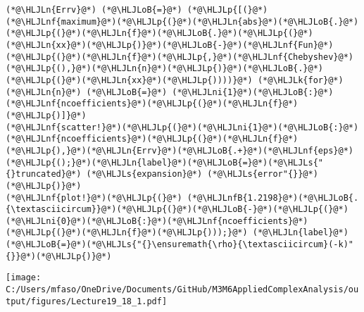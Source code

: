\documentclass[12pt,a4paper]{article}
\newcommand{\HLJLk}[1]{\textcolor[RGB]{148,91,176}{\textbf{#1}}}
\newcommand{\HLJLn}[1]{#1}
\newcommand{\HLJLnf}[1]{\textcolor[RGB]{66,102,213}{#1}}
\newcommand{\HLJLs}[1]{\textcolor[RGB]{201,61,57}{#1}}
\newcommand{\HLJLnfB}[1]{\textcolor[RGB]{59,151,46}{#1}}
\newcommand{\HLJLni}[1]{\textcolor[RGB]{59,151,46}{#1}}
\newcommand{\HLJLoB}[1]{\textcolor[RGB]{102,102,102}{\textbf{#1}}}
\newcommand{\HLJLp}[1]{#1}
\begin{document}
\begin{lstlisting}
(*@\HLJLn{Errv}@*) (*@\HLJLoB{=}@*) (*@\HLJLp{[(}@*)(*@\HLJLnf{maximum}@*)(*@\HLJLp{(}@*)(*@\HLJLn{abs}@*)(*@\HLJLoB{.}@*)(*@\HLJLp{(}@*)(*@\HLJLn{f}@*)(*@\HLJLoB{.}@*)(*@\HLJLp{(}@*)(*@\HLJLn{xx}@*)(*@\HLJLp{)}@*)(*@\HLJLoB{-}@*)(*@\HLJLnf{Fun}@*)(*@\HLJLp{(}@*)(*@\HLJLn{f}@*)(*@\HLJLp{,}@*)(*@\HLJLnf{Chebyshev}@*)(*@\HLJLp{(),}@*)(*@\HLJLn{n}@*)(*@\HLJLp{)}@*)(*@\HLJLoB{.}@*)(*@\HLJLp{(}@*)(*@\HLJLn{xx}@*)(*@\HLJLp{))))}@*) (*@\HLJLk{for}@*) (*@\HLJLn{n}@*) (*@\HLJLoB{=}@*) (*@\HLJLni{1}@*)(*@\HLJLoB{:}@*)(*@\HLJLnf{ncoefficients}@*)(*@\HLJLp{(}@*)(*@\HLJLn{f}@*)(*@\HLJLp{)]}@*)
(*@\HLJLnf{scatter!}@*)(*@\HLJLp{(}@*)(*@\HLJLni{1}@*)(*@\HLJLoB{:}@*)(*@\HLJLnf{ncoefficients}@*)(*@\HLJLp{(}@*)(*@\HLJLn{f}@*)(*@\HLJLp{),}@*)(*@\HLJLn{Errv}@*)(*@\HLJLoB{.+}@*)(*@\HLJLnf{eps}@*)(*@\HLJLp{();}@*)(*@\HLJLn{label}@*)(*@\HLJLoB{=}@*)(*@\HLJLs{"{}truncated}@*) (*@\HLJLs{expansion}@*) (*@\HLJLs{error"{}}@*)(*@\HLJLp{)}@*)
(*@\HLJLnf{plot!}@*)(*@\HLJLp{(}@*) (*@\HLJLnfB{1.2198}@*)(*@\HLJLoB{.{\textasciicircum}}@*)(*@\HLJLp{(}@*)(*@\HLJLoB{-}@*)(*@\HLJLp{(}@*)(*@\HLJLni{0}@*)(*@\HLJLoB{:}@*)(*@\HLJLnf{ncoefficients}@*)(*@\HLJLp{(}@*)(*@\HLJLn{f}@*)(*@\HLJLp{)));}@*) (*@\HLJLn{label}@*)(*@\HLJLoB{=}@*)(*@\HLJLs{"{}\ensuremath{\rho}{\textasciicircum}(-k)"{}}@*)(*@\HLJLp{)}@*)
\end{lstlisting}

\texttt{[image: C:/Users/mfaso/OneDrive/Documents/GitHub/M3M6AppliedComplexAnalysis/output/figures/Lecture19\_18\_1.pdf]}
\end{document}
